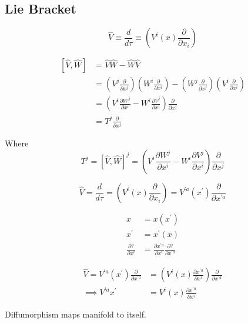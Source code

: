 \documentclass[12pt, letterpaper]{article}
\newcommand*{\1}{\hspace{1pt}}
\begin{document}
    \subsection*{Lie Bracket}
    \begin{equation}
        \hat{V} \equiv  \frac{d}{d \tau} \equiv  (V^{i}(x) \frac{\partial}{\partial x_{i}})
    \end{equation}

    \begin{equation}
        \begin{split}
        \left[\hat{V}, \hat{W}\right] & = \hat{V}\hat{W} - \hat{W}\hat{V}  \\ 
            & = \left(V^{j}\frac{\partial}{\partial x^{j}}\right)\left(W^{i}\frac{\partial}{\partial x^{i}}\right) - \left(W^{j}\frac{\partial}{\partial x^{j}}\right)\left(V^{i}\frac{\partial}{\partial x^{i}}\right)   \\
            & = \left(V^{i}\frac{\partial W^{j}}{\partial x^{i}} - W^{i}\frac{\partial V^{j}}{\partial x^{i}}\right)\frac{\partial}{\partial x^{j}} \\ 
            & = T^{j}\frac{\partial}{\partial x^{j}} 
        \end{split}
    \end{equation}

    Where 
    \begin{equation*}
        T^{j} = \left[\hat{V}, \hat{W}\right]^{j} =  \left(V^{i}\frac{\partial W^{j}}{\partial x^{i}} - W^{i}\frac{\partial V^{j}}{\partial x^{i}}\right)\frac{\partial}{\partial x^{j}}
    \end{equation*}

    \begin{equation}
        \hat{V} = \frac{d}{d \tau} = (V^{i}(x) \frac{\partial}{\partial x_{i}}) = V^{'a}({x^{'}})\frac{\partial}{\partial x^{'a}}
    \end{equation}

    \begin{equation*}
        \begin{split}
            x & = x(x^{'}) \\ 
            x^{'} & = x^{'}(x) \\
            \frac{\partial ?}{\partial x^{i}} & = \frac{\partial x^{'a}}{\partial x^{i}}\frac{\partial ?}{\partial x^{'a}} 
        \end{split}
    \end{equation*}

    \begin{equation}
        \begin{split}
        \hat{V} = V^{'a}({x^{'}})\frac{\partial}{\partial x^{'a}} & = \left(V^{i}({x})\frac{\partial x^{'a}}{\partial x^{i}}\right)\frac{\partial}{\partial x^{'a}} \\ 
        \implies V^{'a}{x^{'}}  & = V^{i}(x)\frac{\partial x^{'a}}{\partial x^{i}}
        \end{split}
    \end{equation}

    Diffumorphism maps manifold to itself.
\end{document}
